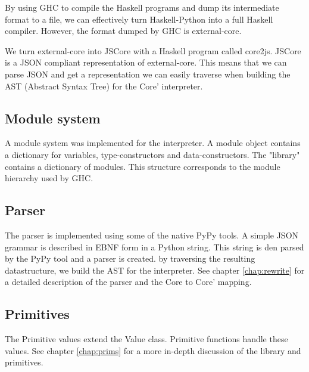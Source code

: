 
By using GHC to compile the Haskell programs and dump its intermediate
format to a file, we can effectively turn Haskell-Python into a full
Haskell compiler. However, the format dumped by GHC is external-core.

We turn external-core into JSCore with a Haskell program called core2js.
JSCore is a JSON compliant representation of external-core. This means that
we can parse JSON and get a representation we can easily traverse when building
the AST (Abstract Syntax Tree) for the Core' interpreter.

\subsection{Module system}

A module system was implemented for the interpreter. A module object contains
a dictionary for variables, type-constructors and data-constructors. The 
"library" contains a dictionary of modules. This structure corresponds to the
module hierarchy used by GHC.

\subsection{Parser}


The parser is implemented using some of the native PyPy tools. A simple 
JSON grammar is described in EBNF form in a Python string. This string
is den parsed by the PyPy tool and a parser is created. by traversing the
resulting datastructure, we build the AST for the interpreter. See chapter 
\ref{chap:rewrite} for a detailed description of the parser and the 
Core to Core' mapping.

\subsection{Primitives}

The Primitive values extend the Value class. Primitive functions handle
these values.
See chapter \ref{chap:prims} for a more in-depth discussion of the
library and primitives.
